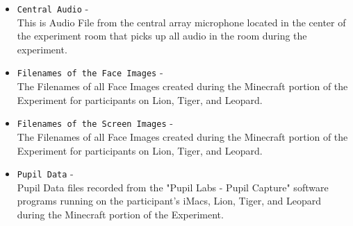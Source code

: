 \begin{description}
\begin{addmargin}[0em]{0em}
\begin{itemize}
        \item \verb|Central Audio| -\\This is Audio File from the central array microphone located in the center of the experiment room that picks up all audio in the room during the experiment.
        \item \verb|Filenames of the Face Images| -\\The Filenames of all Face Images created during the Minecraft portion of the Experiment for participants on Lion, Tiger, and Leopard.
        \item \verb|Filenames of the Screen Images| -\\The Filenames of all Face Images created during the Minecraft portion of the Experiment for participants on Lion, Tiger, and Leopard.
        \item \verb|Pupil Data| -\\Pupil Data files recorded from the "Pupil Labs - Pupil Capture" software programs running on the participant's iMacs, Lion, Tiger, and Leopard during the Minecraft portion of the Experiment.
    \end{itemize}

\end{addmargin}


\end{description}
